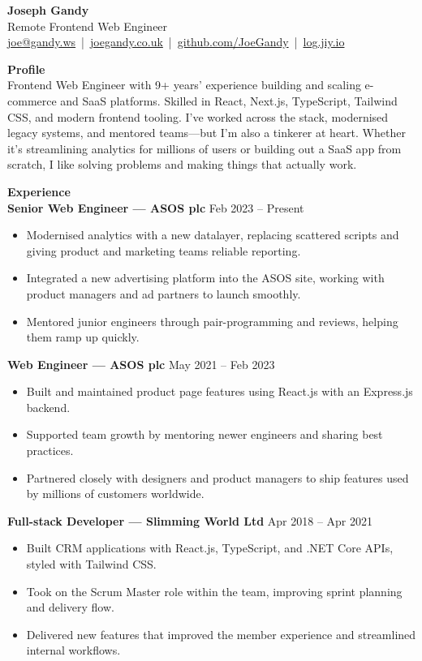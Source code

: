 \documentclass[11pt,a4paper]{article}
\newcommand{\cvsection}[1]{\vspace{0.8em}\noindent\large\textbf{#1}\vspace{0.4em}\\}
\begin{document}
\begin{center}
    {\LARGE \textbf{Joseph Gandy}} \\[6pt]
    Remote Frontend Web Engineer \\[6pt]
    \href{mailto:joe@gandy.ws}{joe@gandy.ws} \,|\, \href{https://joegandy.co.uk}{joegandy.co.uk} \,|\, \href{https://github.com/JoeGandy}{github.com/JoeGandy} \,|\, \href{https://log.jiy.io}{log.jiy.io}
\end{center}

\cvsection{Profile}
Frontend Web Engineer with 9+ years' experience building and scaling e-commerce and SaaS platforms. Skilled in React, Next.js, TypeScript, Tailwind CSS, and modern frontend tooling. I've worked across the stack, modernised legacy systems, and mentored teams---but I'm also a tinkerer at heart. Whether it's streamlining analytics for millions of users or building out a SaaS app from scratch, I like solving problems and making things that actually work.

\cvsection{Experience}
\textbf{Senior Web Engineer --- ASOS plc} \hfill Feb 2023 -- Present
\begin{itemize}
  \item Modernised analytics with a new datalayer, replacing scattered scripts and giving product and marketing teams reliable reporting.
  \item Integrated a new advertising platform into the ASOS site, working with product managers and ad partners to launch smoothly.
  \item Mentored junior engineers through pair-programming and reviews, helping them ramp up quickly.
\end{itemize}

\textbf{Web Engineer --- ASOS plc} \hfill May 2021 -- Feb 2023
\begin{itemize}
  \item Built and maintained product page features using React.js with an Express.js backend.
  \item Supported team growth by mentoring newer engineers and sharing best practices.
  \item Partnered closely with designers and product managers to ship features used by millions of customers worldwide.
\end{itemize}

\textbf{Full-stack Developer --- Slimming World Ltd} \hfill Apr 2018 -- Apr 2021
\begin{itemize}
  \item Built CRM applications with React.js, TypeScript, and .NET Core APIs, styled with Tailwind CSS.
  \item Took on the Scrum Master role within the team, improving sprint planning and delivery flow.
  \item Delivered new features that improved the member experience and streamlined internal workflows.
\end{itemize}
\end{document}
